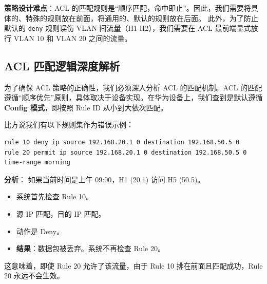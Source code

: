 \documentclass[a4paper]{article}
\begin{document}
\begin{myquote}
    \textbf{策略设计难点}：ACL 的匹配规则是“顺序匹配，命中即止”。因此，我们需要将具体的、特殊的规则放在前面，将通用的、默认的规则放在后面。
    此外，为了防止默认的 \texttt{deny} 规则误伤 VLAN 间流量（H1-H2），我们需要在 ACL 最前端显式放行 VLAN 10 和 VLAN 20 之间的流量。
\end{myquote}

\subsection{ACL 匹配逻辑深度解析}
为了确保 ACL 策略的正确性，我们必须深入分析 ACL 的匹配机制。ACL 的匹配遵循“顺序优先”原则，具体取决于设备实现。在华为设备上，我们查到是默认遵循 \textbf{Config 模式}，即按照 Rule ID 从小到大依次匹配。

比方说我们有以下规则集作为错误示例：
\begin{lstlisting}[language=HuaweiConfig, caption={ACL 错误示例}]
rule 10 deny ip source 192.168.20.1 0 destination 192.168.50.5 0
rule 20 permit ip source 192.168.20.1 0 destination 192.168.50.5 0 time-range morning
\end{lstlisting}
\textbf{分析}：
如果当前时间是上午 09:00，H1 (20.1) 访问 H5 (50.5)。
\begin{itemize}
    \item 系统首先检查 Rule 10。
    \item 源 IP 匹配，目的 IP 匹配。
    \item 动作是 Deny。
    \item \textbf{结果}：数据包被丢弃。系统不再检查 Rule 20。
\end{itemize}
这意味着，即使 Rule 20 允许了该流量，由于 Rule 10 排在前面且匹配成功，Rule 20 永远不会生效。
\end{document}
